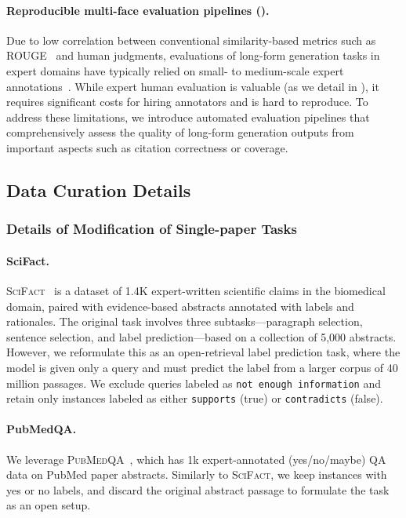 \paragraph{Reproducible multi-face evaluation pipelines ().}  
Due to low correlation between conventional similarity-based metrics such as ROUGE~\citep{xu2023critical,malaviya2023expertqa} and human judgments, evaluations of long-form generation tasks in expert domains have typically relied on small- to medium-scale expert annotations~\citep{zheng2024openresearcher,singhal2023large,si2024can}. While expert human evaluation is valuable (as we detail in ), it requires significant costs for hiring annotators and is hard to reproduce. 
To address these limitations, we introduce automated evaluation pipelines that comprehensively assess the quality of long-form generation outputs from important aspects such as citation correctness or coverage. 

\subsection{Data Curation Details}
\label{app_sec:annotation_details}

\subsubsection{Details of Modification of Single-paper Tasks }
\paragraph{SciFact.}
\textsc{SciFact}~\citep{wadden-etal-2020-fact} is a dataset of 1.4K expert-written scientific claims in the biomedical domain, paired with evidence-based abstracts annotated with labels and rationales. The original task involves three subtasks---paragraph selection, sentence selection, and label prediction---based on a collection of 5,000 abstracts. However, we reformulate this as an open-retrieval label prediction task, where the model is given only a query and must predict the label from a larger corpus of 40 million passages. 
We exclude queries labeled as \texttt{not enough information} and retain only instances labeled as either \texttt{supports} (true) or \texttt{contradicts} (false).


\paragraph{PubMedQA.}
We leverage \textsc{PubMedQA}~\citep{jin-etal-2019-pubmedqa}, which has 1k expert-annotated (yes/no/maybe) QA data on PubMed paper abstracts. 
Similarly to \textsc{SciFact}, we keep instances with yes or no labels, and discard the original abstract passage to formulate the task as an open setup. 

